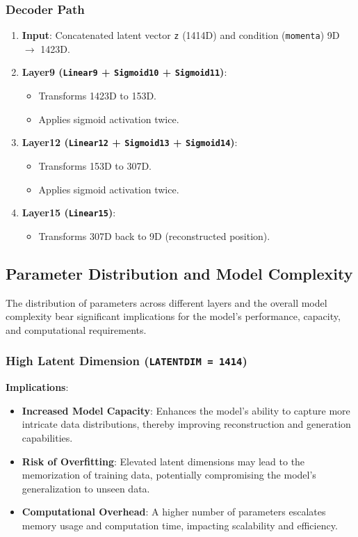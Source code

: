 \documentclass[10pt]{article}
\begin{document}
\subsubsection{Decoder Path}

\begin{enumerate}
    \item \textbf{Input}: Concatenated latent vector \texttt{z} (1414D) and condition (\texttt{momenta}) 9D $\rightarrow$ 1423D.
    \item \textbf{Layer9 (\texttt{Linear9} + \texttt{Sigmoid10} + \texttt{Sigmoid11})}:
    \begin{itemize}
        \item Transforms 1423D to 153D.
        \item Applies sigmoid activation twice.
    \end{itemize}
    \item \textbf{Layer12 (\texttt{Linear12} + \texttt{Sigmoid13} + \texttt{Sigmoid14})}:
    \begin{itemize}
        \item Transforms 153D to 307D.
        \item Applies sigmoid activation twice.
    \end{itemize}
    \item \textbf{Layer15 (\texttt{Linear15})}:
    \begin{itemize}
        \item Transforms 307D back to 9D (reconstructed position).
    \end{itemize}
\end{enumerate}

\subsection{Parameter Distribution and Model Complexity}

The distribution of parameters across different layers and the overall model complexity bear significant implications for the model's performance, capacity, and computational requirements.

\subsubsection{High Latent Dimension (\texttt{LATENTDIM = 1414})}

\textbf{Implications}:

\begin{itemize}
    \item \textbf{Increased Model Capacity}: Enhances the model's ability to capture more intricate data distributions, thereby improving reconstruction and generation capabilities.
    \item \textbf{Risk of Overfitting}: Elevated latent dimensions may lead to the memorization of training data, potentially compromising the model's generalization to unseen data.
    \item \textbf{Computational Overhead}: A higher number of parameters escalates memory usage and computation time, impacting scalability and efficiency.
\end{itemize}
\end{document}

